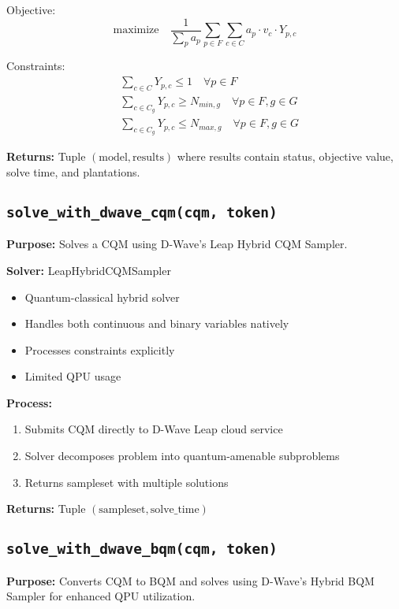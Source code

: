\documentclass{article}
\begin{document}
Objective:
$$\text{maximize} \quad \frac{1}{\sum_p a_p} \sum_{p \in F} \sum_{c \in C} a_p \cdot v_c \cdot Y_{p,c}$$

Constraints:
\begin{align*}
& \sum_{c \in C} Y_{p,c} \leq 1 \quad \forall p \in F \\
& \sum_{c \in C_g} Y_{p,c} \geq N_{min,g} \quad \forall p \in F, g \in G \\
& \sum_{c \in C_g} Y_{p,c} \leq N_{max,g} \quad \forall p \in F, g \in G
\end{align*}

\textbf{Returns:} Tuple $(\text{model}, \text{results})$ where results contain status, objective value, solve time, and plantations.

\subsection{\texttt{solve\_with\_dwave\_cqm(cqm, token)}}

\textbf{Purpose:} Solves a CQM using D-Wave's Leap Hybrid CQM Sampler.

\textbf{Solver:} LeapHybridCQMSampler
\begin{itemize}
    \item Quantum-classical hybrid solver
    \item Handles both continuous and binary variables natively
    \item Processes constraints explicitly
    \item Limited QPU usage
\end{itemize}

\textbf{Process:}
\begin{enumerate}
    \item Submits CQM directly to D-Wave Leap cloud service
    \item Solver decomposes problem into quantum-amenable subproblems
    \item Returns sampleset with multiple solutions
\end{enumerate}

\textbf{Returns:} Tuple $(\text{sampleset}, \text{solve\_time})$

\subsection{\texttt{solve\_with\_dwave\_bqm(cqm, token)}}

\textbf{Purpose:} Converts CQM to BQM and solves using D-Wave's Hybrid BQM Sampler for enhanced QPU utilization.
\end{document}
